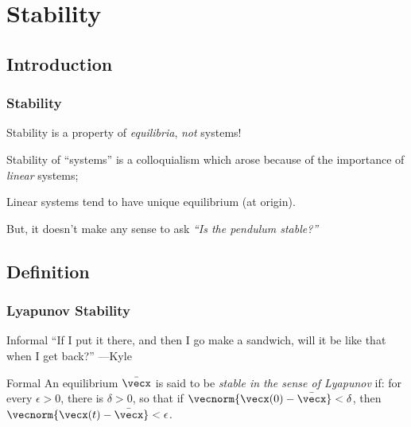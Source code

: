 \documentclass[12pt]{beamer}
\begin{document}
\section{Stability}

\subsection{Introduction}

\begin{frame}
\frametitle{Stability}

\begin{itemize}

\vitem Stability is a property of \emph{equilibria}, \emph{not} systems!

\vitem Stability of ``systems'' is a colloquialism which arose because of the importance of \emph{linear} systems;

\vitem Linear systems tend to have unique equilibrium (at origin).

\vitem But, it doesn't make any sense to ask \emph{``Is the pendulum stable?''}

\end{itemize}

\end{frame}



\subsection{Definition}

\begin{frame}
\frametitle{Lyapunov Stability}
\vfill
\begin{block}{Informal}
``If I put it there, and then I go make a sandwich, will it be like that when I get back?''
---Kyle
\end{block}

\vfill
\begin{block}{Formal}
An equilibrium $\bar\vecx$ is said to be \emph{stable in the sense of Lyapunov} if:
for every $\epsilon > 0$, there is $\delta >0$, so that
if $\vecnorm{\vecx(0)-\bar\vecx} < \delta$, then
$\vecnorm{\vecx(t) - \bar\vecx} < \epsilon$. 
\end{block}

\vfill\null

\end{frame}
\end{document}
